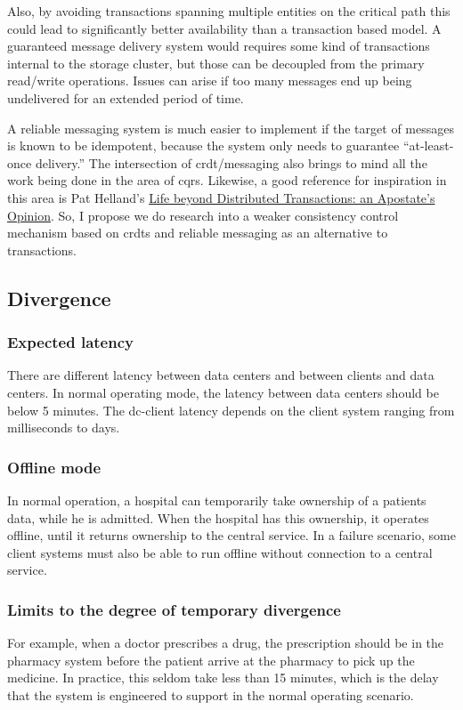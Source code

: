 \documentclass[11pt,a4paper]{report}
\begin{document}
Also, by avoiding transactions spanning multiple entities on the critical path this could lead to significantly better availability than a transaction based model.
A guaranteed message delivery system would requires some kind of transactions internal to the storage cluster, but those can be decoupled from the primary read/write operations. Issues can arise if too many messages end up being undelivered for an extended period of time.

A reliable messaging system is much easier to implement if the target of messages is known to be idempotent, because the system only needs to guarantee ``at-least-once delivery.''
The intersection of \gls{crdt}/messaging also brings to mind all the work being done in the area of \gls{cqrs}. Likewise, a good reference for inspiration in this area is Pat Helland's \hyperlink{http://www.ics.uci.edu/~cs223/papers/cidr07p15.pdf}{Life beyond Distributed Transactions: an Apostate's Opinion}. So, I propose we do research into a weaker consistency control mechanism based on \glspl{crdt} and reliable messaging as an alternative to transactions.

\subsection{Divergence}
\subsubsection{Expected latency}
There are different latency between data centers and between clients and data centers.
In normal operating mode, the latency between data centers should be below 5 minutes.
The \gls{dc}-client latency depends on the client system ranging from milliseconds to days.

\subsubsection{Offline mode}
In normal operation, a hospital can temporarily take ownership of a patients data, while he is admitted. When the hospital has this ownership, it operates offline, until it returns ownership to the central service.
In a failure scenario, some client systems must also be able to run offline without connection to a central service.

\subsubsection{Limits to the degree of temporary divergence}
For example, when a doctor prescribes a drug, the prescription should be in the pharmacy system before the patient arrive at the pharmacy to pick up the medicine. In practice, this seldom take less than 15 minutes, which is the delay that the system is engineered to support in the normal operating scenario.
\end{document}
